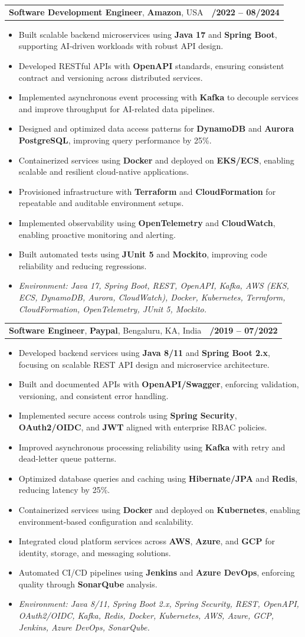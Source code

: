 \documentclass[letterpaper,11pt]{article}
\makeatletter
\newcommand{\resumeItem}[1]{
  \item\footnotesize{
    {#1 \vspace{-2pt}}
  }
}
\newcommand{\resumeSubheading}[4]{
  \vspace{-2pt}\item
    \begin{tabular*}{1.0\textwidth}[t]{l@{\extracolsep{\fill}}r}
      \textbf{\fontsize{10pt}{14pt}\selectfont #3}, \textbf{\fontsize{10pt}{14pt}\selectfont #1}, \fontsize{10pt}{14pt}\selectfont #4 & \textbf{\fontsize{10pt}{14pt}\selectfont #2} \\
    \end{tabular*}\vspace{-7pt}
}
\newcommand{\resumeItemListStart}{\begin{itemize}[leftmargin=*]}
\newcommand{\resumeItemListEnd}{\end{itemize}\vspace{-5pt}}
\makeatother
\begin{document}
\resumeSubheading
{Amazon}{10/2022 -- 08/2024}
{Software Development Engineer}{USA}
\resumeItemListStart
  \resumeItem{Built scalable backend microservices using \textbf{Java 17} and \textbf{Spring Boot}, supporting AI-driven workloads with robust API design.}
  \resumeItem{Developed RESTful APIs with \textbf{OpenAPI} standards, ensuring consistent contract and versioning across distributed services.}
  \resumeItem{Implemented asynchronous event processing with \textbf{Kafka} to decouple services and improve throughput for AI-related data pipelines.}
  \resumeItem{Designed and optimized data access patterns for \textbf{DynamoDB} and \textbf{Aurora PostgreSQL}, improving query performance by 25\%.}
  \resumeItem{Containerized services using \textbf{Docker} and deployed on \textbf{EKS/ECS}, enabling scalable and resilient cloud-native applications.}
  \resumeItem{Provisioned infrastructure with \textbf{Terraform} and \textbf{CloudFormation} for repeatable and auditable environment setups.}
  \resumeItem{Implemented observability using \textbf{OpenTelemetry} and \textbf{CloudWatch}, enabling proactive monitoring and alerting.}
  \resumeItem{Built automated tests using \textbf{JUnit 5} and \textbf{Mockito}, improving code reliability and reducing regressions.}
  \resumeItem{\textit{Environment: Java 17, Spring Boot, REST, OpenAPI, Kafka, AWS (EKS, ECS, DynamoDB, Aurora, CloudWatch), Docker, Kubernetes, Terraform, CloudFormation, OpenTelemetry, JUnit 5, Mockito.}}
\resumeItemListEnd

\resumeSubheading
{Paypal}{08/2019 -- 07/2022}
{Software Engineer}{Bengaluru, KA, India}
\resumeItemListStart
  \resumeItem{Developed backend services using \textbf{Java 8/11} and \textbf{Spring Boot 2.x}, focusing on scalable REST API design and microservice architecture.}
  \resumeItem{Built and documented APIs with \textbf{OpenAPI/Swagger}, enforcing validation, versioning, and consistent error handling.}
  \resumeItem{Implemented secure access controls using \textbf{Spring Security}, \textbf{OAuth2/OIDC}, and \textbf{JWT} aligned with enterprise RBAC policies.}
  \resumeItem{Improved asynchronous processing reliability using \textbf{Kafka} with retry and dead-letter queue patterns.}
  \resumeItem{Optimized database queries and caching using \textbf{Hibernate/JPA} and \textbf{Redis}, reducing latency by 25\%.}
  \resumeItem{Containerized services using \textbf{Docker} and deployed on \textbf{Kubernetes}, enabling environment-based configuration and scalability.}
  \resumeItem{Integrated cloud platform services across \textbf{AWS}, \textbf{Azure}, and \textbf{GCP} for identity, storage, and messaging solutions.}
  \resumeItem{Automated CI/CD pipelines using \textbf{Jenkins} and \textbf{Azure DevOps}, enforcing quality through \textbf{SonarQube} analysis.}
  \resumeItem{\textit{Environment: Java 8/11, Spring Boot 2.x, Spring Security, REST, OpenAPI, OAuth2/OIDC, Kafka, Redis, Docker, Kubernetes, AWS, Azure, GCP, Jenkins, Azure DevOps, SonarQube.}}
\resumeItemListEnd
\end{document}
